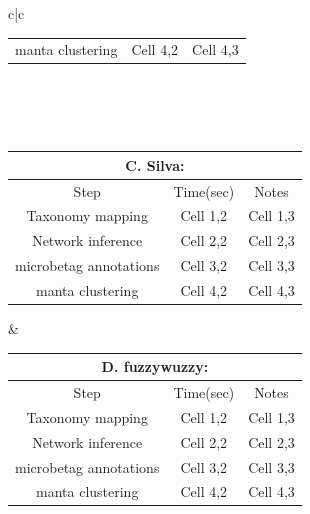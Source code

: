\documentclass[sn-mathphys,Numbered, lineno]{sn-jnl}  %
\theoremstyle{thmstyleone}%
\theoremstyle{thmstyletwo}%
\theoremstyle{thmstylethree}%
\begin{document}
\begin{table}[ht]
\begin{adjustbox}{width=1.3\textwidth,center=\textwidth}
\begin{tabular}{c|c}
\begin{tabular}{ccc}
                    manta clustering & Cell 4,2 & Cell 4,3 \\

                \end{tabular} \\
                \\
                \hline
                \\
                \begin{tabular}{ccc}

                    \multicolumn{3}{c}{C. Silva: } \\
                    \toprule
                    Step &  Time(sec) & Notes \\
                    \toprule

                    Taxonomy mapping & Cell 1,2 & Cell 1,3 \\

                    Network inference & Cell 2,2 & Cell 2,3 \\

                    microbetag annotations & Cell 3,2 & Cell 3,3 \\

                    manta clustering & Cell 4,2 & Cell 4,3 \\

                \end{tabular} &

                \begin{tabular}{ccc}

                    \multicolumn{3}{c}{D. fuzzywuzzy: } \\
                    \toprule
                    Step &  Time(sec) & Notes \\
                    \toprule

                    Taxonomy mapping & Cell 1,2 & Cell 1,3 \\

                    Network inference & Cell 2,2 & Cell 2,3 \\

                    microbetag annotations & Cell 3,2 & Cell 3,3 \\

                    manta clustering & Cell 4,2 & Cell 4,3 \\

                \end{tabular} \\


\end{tabular}
\end{adjustbox}
\end{table}
\end{document}
